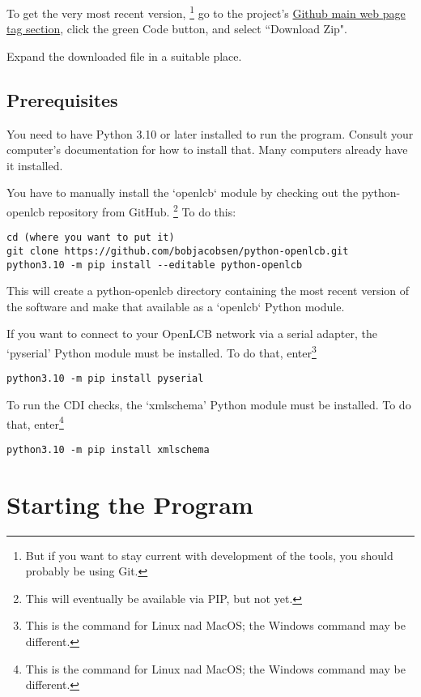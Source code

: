To get the very most recent version,
\footnote{But if you want to stay current with development of the tools, you should probably be using Git.}
go to the project's
\href{https://github.com/bobjacobsen/OlcbChecker}{Github main web page tag section},
click the green Code button, and select ``Download Zip".

Expand the downloaded file in a suitable place.

\subsection{Prerequisites}

You need to have Python 3.10 or later installed to run the program. Consult your
computer's documentation for how to install that.  Many computers already
have it installed.

You have to manually install the `openlcb` module by checking out the
python-openlcb repository from GitHub.
\footnote{This will eventually be available via PIP, but not yet.}
To do this:
\begin{verbatim}
cd (where you want to put it)
git clone https://github.com/bobjacobsen/python-openlcb.git
python3.10 -m pip install --editable python-openlcb
\end{verbatim}
This will create a python-openlcb directory containing the most recent version of the software
and make that available as a `openlcb` Python module.

If you want to connect to your OpenLCB network via a serial adapter, 
the `pyserial' Python module must be installed. To do that,
enter\footnote{This is the command for Linux nad MacOS; the Windows command may be different.}

\begin{verbatim}
python3.10 -m pip install pyserial
\end{verbatim}

To run the CDI checks, the `xmlschema' Python module must be installed. To do that,
enter\footnote{This is the command for Linux nad MacOS; the Windows command may be different.}

\begin{verbatim}
python3.10 -m pip install xmlschema
\end{verbatim}

\section{Starting the Program}


